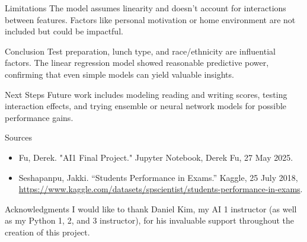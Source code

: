 \documentclass{beamer}
\begin{document}
\begin{frame}{Limitations}
  The model assumes linearity and doesn't account for interactions between features. Factors like personal motivation or home environment are not included but could be impactful.
\end{frame}

\begin{frame}{Conclusion}
  Test preparation, lunch type, and race/ethnicity are influential factors. The linear regression model showed reasonable predictive power, confirming that even simple models can yield valuable insights.
\end{frame}

\begin{frame}{Next Steps}
  Future work includes modeling reading and writing scores, testing interaction effects, and trying ensemble or neural network models for possible performance gains.
\end{frame}

\begin{frame}{Sources}
  \begin{itemize}
    \item Fu, Derek. "AI1 Final Project." Jupyter Notebook, Derek Fu, 27 May 2025.
    \item Seshapanpu, Jakki. “Students Performance in Exams.” Kaggle, 25 July 2018, \href{https://www.kaggle.com/datasets/spscientist/students-performance-in-exams}{https://www.kaggle.com/datasets/spscientist/students-performance-in-exams}.
  \end{itemize}
\end{frame}

\begin{frame}{Acknowledgments}
  I would like to thank Daniel Kim, my AI 1 instructor (as well as my Python 1, 2, and 3 instructor), for his invaluable support throughout the creation of this project.
\end{frame}
\end{document}
